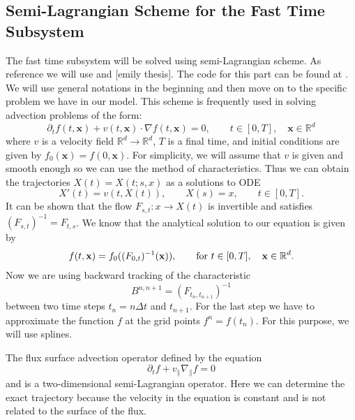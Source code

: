 \subsection{Semi-Lagrangian Scheme for the Fast Time Subsystem}

The fast time subsystem will be solved using semi-Lagrangian scheme. As reference we will use \cite{campospinto} and [emily thesis]. %
The code for this part can be found at \cite{pygyro_code}. We will use general notations in the beginning and then move on to the specific problem we have in our model. This scheme is frequently used in solving advection problems of the form:
\begin{equation}
    \partial_t f(t,\mathbf{x})+v(t,\mathbf{x})\cdot \nabla f(t,\mathbf{x})=0, \qquad t\in[0,T], \quad \mathbf{x}\in\mathbb{R}^d
\end{equation}
where $v$ is a velocity field $\mathbb{R}^d\longrightarrow\mathbb{R}^d$, $T$ is a final time, and initial conditions are given by $f_0(\mathbf{x})=f(0,\mathbf{x})$. For simplicity, we will assume that $v$ is given and smooth enough so we can use the method of characteristics. Thus we can obtain the trajectories $X(t)=X(t;s,x)$ as a solutions to ODE
\begin{equation}
    X'(t)=v(t,X(t)), \qquad X(s)=x, \qquad t\in[0,T].
\end{equation}
It can be shown that the flow $F_{s,t}:x\longrightarrow X(t)$ is invertible and satisfies $(F_{s,t})^{-1}=F_{t,s}$. We know that the analytical solution to our equation is given by
\begin{equation}
    f(t,\mathbf{x})=f_0((F_{0,t})^{-1}(\mathbf{x})),\qquad \text{for } t\in[0,T], \quad \mathbf{x}\in\mathbb{R}^d.
\end{equation}
Now we are using backward tracking of the characteristic
\begin{equation}
    B^{n,n+1}=(F_{t_n,t_{n+1}})^{-1}
\end{equation}
between two time steps $t_n=n\Delta t$ and $t_{n+1}$. For the last step we have to approximate the function $f$ at the grid points $f^n=f(t_n)$. For this purpose, we will use splines.

The flux surface advection operator defined by the equation
\begin{equation}
 \partial_t f + v_\parallel \nabla_\parallel f = 0
\end{equation}
and is a two-dimensional semi-Lagrangian operator. Here we can determine the exact trajectory because the velocity in the equation is constant and is not related to the surface of the flux.

